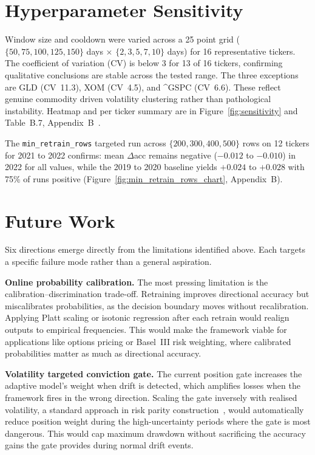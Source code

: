 \section{Hyperparameter Sensitivity}
\label{sec:sensitivity}

Window size and cooldown were varied across a 25 point grid ($\{50,75,100,125,150\}$ days $\times$ $\{2,3,5,7,10\}$ days) for 16 representative tickers. The coefficient of variation (CV) is below 3 for 13 of 16 tickers, confirming qualitative conclusions are stable across the tested range. The three exceptions are GLD (CV~11.3), XOM (CV~4.5), and \^{}GSPC (CV~6.6). These reflect genuine commodity driven volatility clustering rather than pathological instability. Heatmap and per ticker summary are in Figure~\ref{fig:sensitivity} and Table~B.7, Appendix~B~\cite{bergstra2012,probst2019}.

The \texttt{min\_retrain\_rows} targeted run across $\{200, 300, 400, 500\}$ rows on 12 tickers for 2021 to 2022 confirms: mean $\Delta$acc remains negative ($-0.012$ to $-0.010$) in 2022 for all values, while the 2019 to 2020 baseline yields $+0.024$ to $+0.028$ with 75\% of runs positive (Figure~\ref{fig:min_retrain_rows_chart}, Appendix~B).

\section{Future Work}
\label{sec:futurework}

Six directions emerge directly from the limitations identified above. Each targets a specific failure mode rather than a general aspiration.

\textbf{Online probability calibration.} The most pressing limitation is the calibration--discrimination trade-off. Retraining improves directional accuracy but miscalibrates probabilities, as the decision boundary moves without recalibration. Applying Platt scaling or isotonic regression after each retrain would realign outputs to empirical frequencies. This would make the framework viable for applications like options pricing or Basel~III risk weighting, where calibrated probabilities matter as much as directional accuracy.


\textbf{Volatility targeted conviction gate.} The current position gate increases the adaptive model's weight when drift is detected, which amplifies losses when the framework fires in the wrong direction. Scaling the gate inversely with realised volatility, a standard approach in risk parity construction~\cite{rockafellar2000}, would automatically reduce position weight during the high-uncertainty periods where the gate is most dangerous. This would cap maximum drawdown without sacrificing the accuracy gains the gate provides during normal drift events.

